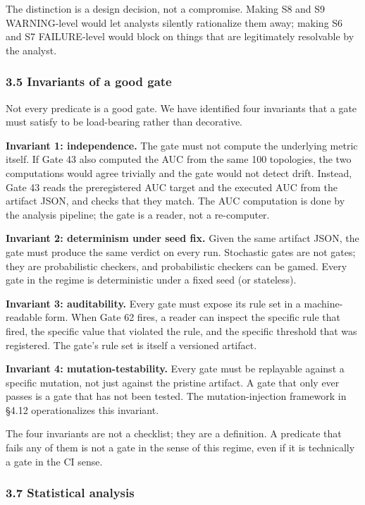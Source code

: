\documentclass[
]{article}
\begin{document}
The distinction is a design decision, not a compromise. Making S8 and S9
WARNING-level would let analysts silently rationalize them away; making
S6 and S7 FAILURE-level would block on things that are legitimately
resolvable by the analyst.

\subsubsection{3.5 Invariants of a good
gate}\label{invariants-of-a-good-gate}

Not every predicate is a good gate. We have identified four invariants
that a gate must satisfy to be load-bearing rather than decorative.

\textbf{Invariant 1: independence.} The gate must not compute the
underlying metric itself. If Gate 43 also computed the AUC from the same
100 topologies, the two computations would agree trivially and the gate
would not detect drift. Instead, Gate 43 reads the preregistered AUC
target and the executed AUC from the artifact JSON, and checks that they
match. The AUC computation is done by the analysis pipeline; the gate is
a reader, not a re-computer.

\textbf{Invariant 2: determinism under seed fix.} Given the same
artifact JSON, the gate must produce the same verdict on every run.
Stochastic gates are not gates; they are probabilistic checkers, and
probabilistic checkers can be gamed. Every gate in the regime is
deterministic under a fixed seed (or stateless).

\textbf{Invariant 3: auditability.} Every gate must expose its rule set
in a machine-readable form. When Gate 62 fires, a reader can inspect the
specific rule that fired, the specific value that violated the rule, and
the specific threshold that was registered. The gate's rule set is
itself a versioned artifact.

\textbf{Invariant 4: mutation-testability.} Every gate must be
replayable against a specific mutation, not just against the pristine
artifact. A gate that only ever passes is a gate that has not been
tested. The mutation-injection framework in §4.12 operationalizes this
invariant.

The four invariants are not a checklist; they are a definition. A
predicate that fails any of them is not a gate in the sense of this
regime, even if it is technically a gate in the CI sense.

\subsubsection{3.7 Statistical analysis}\label{statistical-analysis}
\end{document}
